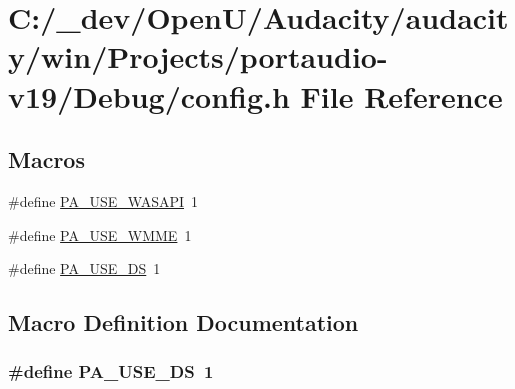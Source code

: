 \hypertarget{win_2_projects_2portaudio-v19_2_debug_2config_8h}{}\section{C\+:/\+\_\+dev/\+Open\+U/\+Audacity/audacity/win/\+Projects/portaudio-\/v19/\+Debug/config.h File Reference}
\label{win_2_projects_2portaudio-v19_2_debug_2config_8h}
\subsection*{Macros}
\begin{DoxyCompactItemize}
\item 
\#define \hyperlink{win_2_projects_2portaudio-v19_2_debug_2config_8h_afedff37b3040fdce39272934269ffe6f}{P\+A\+\_\+\+U\+S\+E\+\_\+\+W\+A\+S\+A\+PI}~1
\item 
\#define \hyperlink{win_2_projects_2portaudio-v19_2_debug_2config_8h_a3bddcc9495e2e6cb9f0a88ea4f7029b5}{P\+A\+\_\+\+U\+S\+E\+\_\+\+W\+M\+ME}~1
\item 
\#define \hyperlink{win_2_projects_2portaudio-v19_2_debug_2config_8h_ad0c4a11803c369d0b37b87fad433f244}{P\+A\+\_\+\+U\+S\+E\+\_\+\+DS}~1
\end{DoxyCompactItemize}


\subsection{Macro Definition Documentation}
\subsubsection[{\texorpdfstring{P\+A\+\_\+\+U\+S\+E\+\_\+\+DS}{PA_USE_DS}}]{\setlength{\rightskip}{0pt plus 5cm}\#define P\+A\+\_\+\+U\+S\+E\+\_\+\+DS~1}\hypertarget{win_2_projects_2portaudio-v19_2_debug_2config_8h_ad0c4a11803c369d0b37b87fad433f244}{}\label{win_2_projects_2portaudio-v19_2_debug_2config_8h_ad0c4a11803c369d0b37b87fad433f244}


